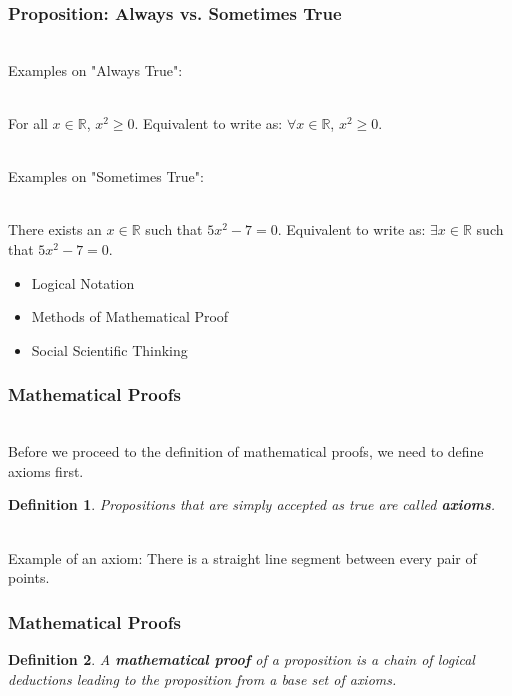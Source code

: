 \documentclass[aspectratio=169, handout]{beamer}
\newtheorem{defn}{Definition}
\numberwithin{equation}{section}
\begin{document}
\begin{frame}
\frametitle{Proposition: Always vs. Sometimes True}

\ \\Examples on "Always True": \pause

\ \\For all $x \in \mathbb{R}$, $x^{2} \geq 0$. Equivalent to write as: $\forall x \in \mathbb{R}$, $x^{2} \geq 0$. \pause

\ \\Examples on "Sometimes True": \pause

\ \\There exists an $x \in \mathbb{R}$ such that $5 x^{2} - 7 = 0$. Equivalent to write as: $\exists x \in \mathbb{R}$ such that $5 x^{2} - 7 = 0$.

\end{frame}




\begin{frame}

\begin{itemize}
\item \textcolor{mygray}{Logical Notation}
\item \textcolor{myblack}{Methods of Mathematical Proof}
\item \textcolor{mygray}{Social Scientific Thinking}
\end{itemize}

\end{frame}



\begin{frame}
\frametitle{Mathematical Proofs}

\ \\Before we proceed to the definition of mathematical proofs, we need to define axioms first. \pause

\begin{defn}
Propositions that are simply accepted as true are called \textbf{axioms}.
\end{defn} \pause

\ \\Example of an axiom: There is a straight line segment between every pair of points.

\end{frame}



\begin{frame}
\frametitle{Mathematical Proofs}

\begin{defn}
A \textbf{mathematical proof} of a proposition is a chain of logical deductions leading to the proposition from a base set of axioms.
\end{defn}

\end{frame}
\end{document}
